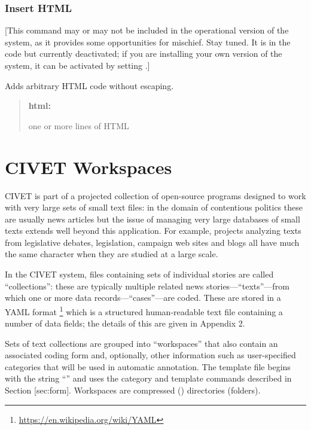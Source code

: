 \documentclass[letterpaper,10pt,english]{sphinxmanual}
\begin{document}
\subsection{Insert HTML}
\label{forms:insert-html}
{[}This command may or may not be included in the operational version of
the system, as it provides some opportunities for mischief. Stay tuned.
It is in the code but currently deactivated; if you are installing your
own version of the system, it can be activated by setting
.{]}

Adds arbitrary HTML code without escaping.
\begin{quote}

\begin{DUlineblock}{0em}
\item[] \textbf{html:}
\item[] one or more lines of HTML
\end{DUlineblock}
\end{quote}


\chapter{CIVET Workspaces}
\label{workspaces:civet-workspaces}\label{workspaces::doc}
CIVET is part of a projected collection of open-source programs designed
to work with very large sets of small text files: in the domain of
contentious politics these are usually news articles but the issue of
managing very large databases of small texts extends well beyond this
application. For example, projects analyzing texts from legislative
debates, legislation, campaign web sites and blogs all have much the
same character when they are studied at a large scale.

In the CIVET system, files containing sets of individual stories are
called “collections”: these are typically multiple related news
stories—“texts”—from which one or more data records—“cases”—are coded.
These are stored in a YAML format \footnote{
\href{https://en.wikipedia.org/wiki/YAML}{https://en.wikipedia.org/wiki/YAML}
} which is a structured
human-readable text file containing a number of data fields; the details
of this are given in Appendix 2.

Sets of text collections are grouped into “workspaces” that also contain
an associated coding form and, optionally, other information such as
user-specified categories that will be used in automatic annotation. The
template file begins with the string “” and uses the category
and template commands described in Section {[}sec:form{]}. Workspaces are
compressed () directories (folders).
\end{document}
